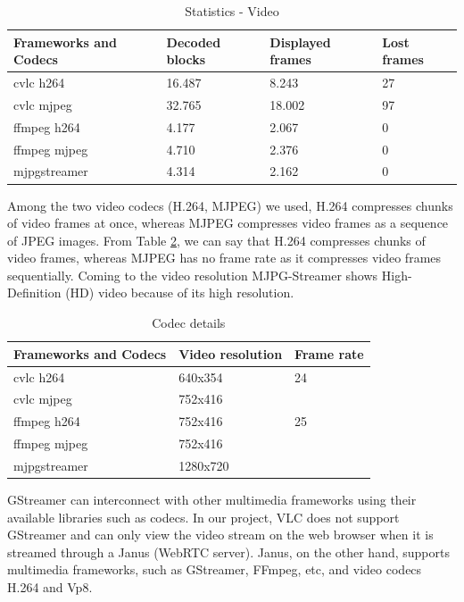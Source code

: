 \begin{table}[H]
	\begin{center}
		\caption{Statistics - Video}
		\label{tab:videoframe}
	\begin{tabular}{l | l | l | l}
		Frameworks and Codecs & Decoded blocks & Displayed frames & Lost frames \\
		\hline \hline
		cvlc h264 & 16.487 & 8.243 & 27 \\
		cvlc mjpeg & 32.765 & 18.002 & 97 \\
		ffmpeg h264 & 4.177 & 2.067 & 0 \\
		ffmpeg mjpeg & 4.710 & 2.376 & 0 \\
		mjpgstreamer & 4.314 & 2.162 & 0 
	\end{tabular}
\end{center}
\end{table} 

Among the two video codecs (H.264, MJPEG) we used, H.264 compresses chunks of video frames at once, whereas MJPEG compresses video frames as a sequence of JPEG images. From Table \ref{tab:videocodec}, we can say that H.264 compresses chunks of video frames, whereas MJPEG has no frame rate as it compresses video frames sequentially. Coming to the video resolution MJPG-Streamer shows High-Definition (HD) video because of its high resolution.

\begin{table}[H]
	\begin{center}
		\caption{Codec details}
		\label{tab:videocodec}
	\begin{tabular}{l | l | l }
		Frameworks and Codecs & Video resolution & Frame rate \\
		\hline \hline
		cvlc h264 & 640x354 & 24\\
		cvlc mjpeg & 752x416 & \\
		ffmpeg h264 & 752x416 & 25\\
		ffmpeg mjpeg & 752x416 & \\
		mjpgstreamer & 1280x720 & 
	\end{tabular}
\end{center}
\end{table}

GStreamer can interconnect with other multimedia frameworks using their available libraries such as codecs. In our project, VLC does not support GStreamer and can only view the video stream on the web browser when it is streamed through a Janus (WebRTC server). Janus, on the other hand, supports multimedia frameworks, such as GStreamer, FFmpeg, etc, and video codecs H.264 and Vp8.

